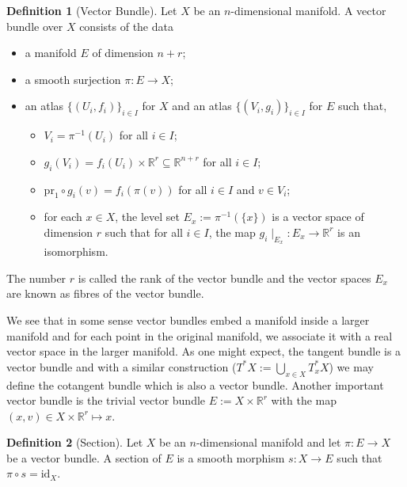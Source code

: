 \documentclass[]{article}
\theoremstyle{definition}
\theoremstyle{definition}
\newtheorem{definition}{Definition}[section]
\begin{document}
\begin{definition}[Vector Bundle]
  Let \(X\) be an \(n\)-dimensional manifold. A vector bundle over \(X\) consists 
  of the data 
  \begin{itemize}
    \item a manifold \(E\) of dimension \(n + r\);
    \item a smooth surjection \(\pi : E \to X\);
    \item an atlas \(\{(U_i, f_i)\}_{i \in I}\) for \(X\) and an atlas 
      \(\{(V_i, g_i)\}_{i \in I}\) for \(E\) such that, 
      \begin{itemize}
        \item \(V_i = \pi^{-1}(U_i)\) for all \(i \in I\);
        \item \(g_i(V_i) = f_i(U_i) \times \mathbb{R}^r \subseteq 
          \mathbb{R}^{n + r}\) for all \(i \in I\);
        \item \(\text{pr}_1 \circ g_i(v) = f_i(\pi(v))\) for all \(i \in I\) and 
          \(v \in V_i\);
        \item for each \(x \in X\), the level set \(E_x := \pi^{-1}(\{x\})\) is 
          a vector space of dimension \(r\) such that for all \(i \in I\), the map 
          \(g_i \mid_{E_x} : E_x \to \mathbb{R}^r\) is an isomorphism.
      \end{itemize}
  \end{itemize}
  The number \(r\) is called the rank of the vector bundle and the vector spaces 
  \(E_x\) are known as fibres of the vector bundle.
\end{definition}

We see that in some sense vector bundles embed a manifold inside a larger manifold 
and for each point in the original manifold, we associate it with a real 
vector space in the larger manifold. As one might expect, the tangent bundle 
is a vector bundle and with a similar construction 
(\(T^*X := \bigcup_{x \in X} T^*_x X\)) we may define the cotangent 
bundle which is also a vector bundle. Another important vector bundle is the 
trivial vector bundle \(E := X \times \mathbb{R}^r\) with the map 
\((x, v) \in X \times \mathbb{R}^r \mapsto x\).

\begin{definition}[Section]
  Let \(X\) be an \(n\)-dimensional manifold and let \(\pi : E \to X\) be a 
  vector bundle. A section of \(E\) is a smooth morphism \(s : X \to E\) such 
  that \(\pi \circ s = \text{id}_X\).
\end{definition}
\end{document}

